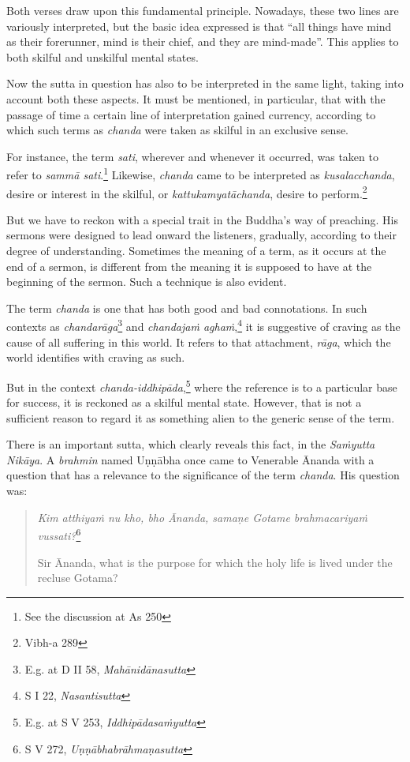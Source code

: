 Both verses draw upon this fundamental principle. Nowadays, these two lines are variously interpreted, but the basic idea expressed is that ``all things have mind as their forerunner, mind is their chief, and they are mind-made''. This applies to both skilful and unskilful mental states.

Now the sutta in question has also to be interpreted in the same light, taking into account both these aspects. It must be mentioned, in particular, that with the passage of time a certain line of interpretation gained currency, according to which such terms as \emph{chanda} were taken as skilful in an exclusive sense.

For instance, the term \emph{sati}, wherever and whenever it occurred, was taken to refer to \emph{sammā sati}.\footnote{See the discussion at As 250} Likewise, \emph{chanda} came to be interpreted as \emph{kusalacchanda}, desire or interest in the skilful, or \emph{kattukamyatāchanda}, desire to perform.\footnote{Vibh-a 289}

But we have to reckon with a special trait in the Buddha's way of preaching. His sermons were designed to lead onward the listeners, gradually, according to their degree of understanding. Sometimes the meaning of a term, as it occurs at the end of a sermon, is different from the meaning it is supposed to have at the beginning of the sermon. Such a technique is also evident.

The term \emph{chanda} is one that has both good and bad connotations. In such contexts as \emph{chandarāga}\footnote{E.g. at D II 58, \emph{Mahānidānasutta}} and \emph{chandajaṁ aghaṁ},\footnote{S I 22, \emph{Nasantisutta}} it is suggestive of craving as the cause of all suffering in this world. It refers to that attachment, \emph{rāga}, which the world identifies with craving as such.

But in the context \emph{chanda-iddhipāda},\footnote{E.g. at S V 253, \emph{Iddhipādasaṁyutta}} where the reference is to a particular base for success, it is reckoned as a skilful mental state. However, that is not a sufficient reason to regard it as something alien to the generic sense of the term.

There is an important sutta, which clearly reveals this fact, in the \emph{Saṁyutta Nikāya}. A \emph{brahmin} named Uṇṇābha once came to Venerable Ānanda with a question that has a relevance to the significance of the term \emph{chanda}. His question was:

\begin{quote}
\emph{Kim atthiyaṁ nu kho, bho Ānanda, samaṇe Gotame brahmacariyaṁ vussati?}\footnote{S V 272, \emph{Uṇṇābhabrāhmaṇasutta}}

Sir Ānanda, what is the purpose for which the holy life is lived under the recluse Gotama?
\end{quote}

